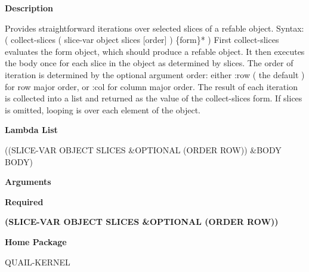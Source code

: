 
{\bf Description}

Provides straightforward iterations over selected slices of a refable object. Syntax: ( collect-slices ( slice-var object slices [order] ) \{form\}* ) First collect-slices evaluates the form object, which should produce a refable object. It then executes the body once for each slice in the object as determined by slices. The order of iteration is determined by the optional argument order: either :row ( the default ) for row major order, or :col for column major order. The result of each iteration is collected into a list and returned as the value of the collect-slices form. If slices is omitted, looping is over each element of the object.

 
{\bf Lambda List}

((SLICE-VAR OBJECT SLICES \&OPTIONAL (ORDER ROW)) \&BODY BODY)

 
{\bf Arguments}


\beginhang
{\bf Required}\hspace{2em}
 
{\bf (SLICE-VAR OBJECT SLICES \&OPTIONAL (ORDER ROW))}


 
\endhang
 
{\bf Home Package}

QUAIL-KERNEL

